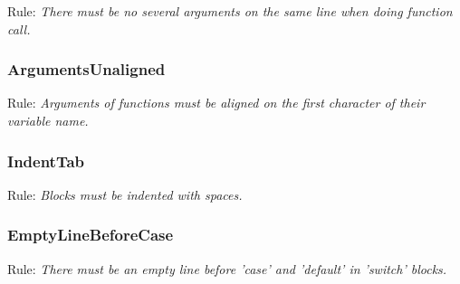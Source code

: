 Rule:
\emph{There must be no several arguments on the same line when doing function call.}

\subsubsection{ArgumentsUnaligned}

Rule:
\emph{Arguments of functions must be aligned on the first character of their variable name.}

\subsubsection{IndentTab}

Rule:
\emph{Blocks must be indented with spaces.}

\subsubsection{EmptyLineBeforeCase}

Rule:
\emph{There must be an empty line before 'case' and 'default' in 'switch' blocks.}

